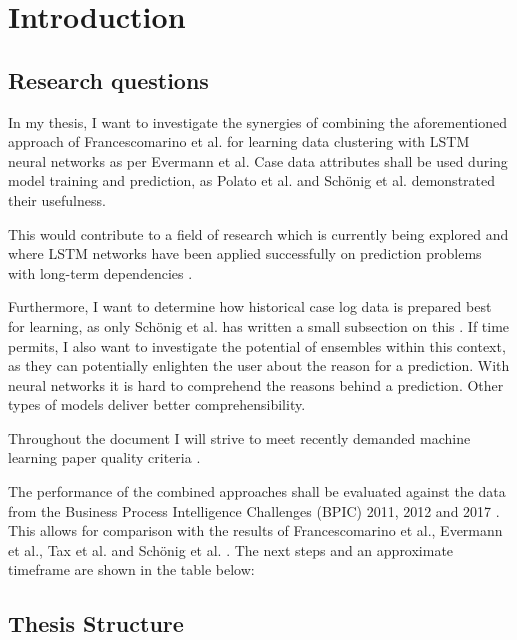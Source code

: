 \chapter{Introduction}\label{sec:intro}


\section{Research questions}\label{sec:intro:objective}
In my thesis, I want to investigate the synergies of combining the aforementioned approach of Francescomarino et al. for learning data clustering with LSTM neural networks as per Evermann et al. Case data attributes shall be used during model training and prediction, as Polato et al. \cite{polato2014} and Schönig et al. \cite{schoenig2018} demonstrated their usefulness.

This would contribute to a field of research which is currently being explored and where LSTM networks have been applied successfully on prediction problems with long-term dependencies \cite{evermann2016, tax2017, schoenig2018, graves2005}.

Furthermore, I want to determine how historical case log data is prepared best for learning, as only Schönig et al. has written a small subsection on this \cite{schoenig2018}.
If time permits, I also want to investigate the potential of ensembles within this context, as they can potentially enlighten the user about the reason for a prediction.
With neural networks it is hard to comprehend the reasons behind a prediction.
Other types of models deliver better comprehensibility.

Throughout the document I will strive to meet recently demanded machine learning paper quality criteria \cite{lipton2018}.

The performance of the combined approaches shall be evaluated against the data from the Business Process Intelligence Challenges (BPIC) 2011, 2012 and 2017 \cite{BPIC2011, BPIC2012, BPIC2017}. This allows for comparison with the results of Francescomarino et al., Evermann et al., Tax et al. and Schönig et al. \cite{francescomarino2018, evermann2016, tax2017, schoenig2018}.
The next steps and an approximate timeframe are shown in the table below:\\[1em]

\section{Thesis Structure}\label{sec:intro:structure}


